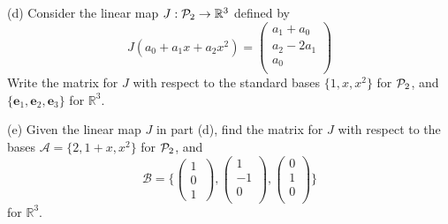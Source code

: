 \begin{question}
	\vspace{.4cm}	
		
\noindent (d) Consider the linear map $J:\P_2 \rightarrow \mathbb{R}^3$ defined by 
\[
J(a_0+a_1x+a_2x^2)= \left( \begin{array}{c}
a_1 + a_0\\
a_2-2a_1 \\
a_0 \\
 \end{array} \right)
 \]
\noindent Write the matrix for $J$ with respect to the standard bases $\{1,x,x^2\}$ for $\P_2$, and $\{\textbf{e}_1,\textbf{e}_2,\textbf{e}_3\}$ for $\mathbb{R}^3$.\\ 
 \vspace{0.5cm}

\noindent (e) Given the linear map $J$ in part (d), find the matrix for $J$ with respect to the bases $\mathcal{A} = \{2,1+x, x^2\}$ for $\P_2$, and 
\[
\mathcal{B} = \Bigg\{\left( \begin{array}{c}
1 \\
0 \\
1\
 \end{array}  \right), \left( \begin{array}{c}
1 \\
-1 \\
0\\
 \end{array} \right), \left( \begin{array}{c}
0 \\
1 \\
0\\
 \end{array} \right)\Bigg\} 
 \]
 for $\mathbb{R}^3.$

 
 
\end{question}